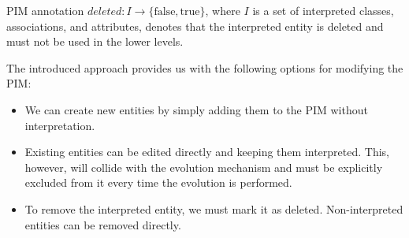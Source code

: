 \begin{definition}[deleted]
    PIM annotation $deleted: I \rightarrow \{\textrm{false}, \textrm{true}\}$, where $I$ is a set of interpreted classes, associations, and attributes, denotes that the interpreted entity is deleted and must not be used in the lower levels.
\end{definition}

\medskip

The introduced approach provides us with the following options for modifying the PIM:
\begin{itemize}
    \item We can create new entities by simply adding them to the PIM without interpretation.
    \item Existing entities can be edited directly and keeping them interpreted. This, however, will collide with the evolution mechanism and must be explicitly excluded from it every time the evolution is performed.
    \item To remove the interpreted entity, we must mark it as deleted. Non-interpreted entities can be removed directly.
\end{itemize}









